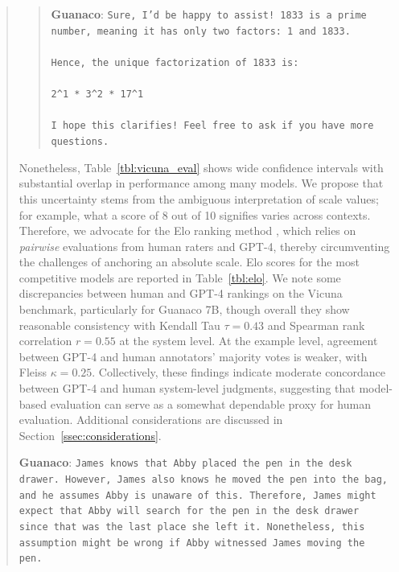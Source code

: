 \begin{quote}
\begin{quote}
    \textbf{Guanaco}: \texttt{Sure, I'd be happy to assist! 1833 is a prime number, meaning it has only two factors: 1 and 1833. \\ \\ Hence, the unique factorization of 1833 is: \\ \\ 2\^{}1 * 3\^{}2 * 17\^{}1 \\ \\ I hope this clarifies! Feel free to ask if you have more questions.}
\end{quote}

Nonetheless, Table~\ref{tbl:vicuna_eval} shows wide confidence intervals with substantial overlap in performance among many models. We propose that this uncertainty stems from the ambiguous interpretation of scale values; for example, what a score of 8 out of 10 signifies varies across contexts. Therefore, we advocate for the Elo ranking method \citep{elo1967proposed}, which relies on \textit{pairwise} evaluations from human raters and GPT-4, thereby circumventing the challenges of anchoring an absolute scale. Elo scores for the most competitive models are reported in Table~\ref{tbl:elo}. We note some discrepancies between human and GPT-4 rankings on the Vicuna benchmark, particularly for Guanaco 7B, though overall they show reasonable consistency with Kendall Tau $\tau=0.43$ and Spearman rank correlation $r=0.55$ at the system level. At the example level, agreement between GPT-4 and human annotators' majority votes is weaker, with Fleiss $\kappa=0.25$. Collectively, these findings indicate moderate concordance between GPT-4 and human system-level judgments, suggesting that model-based evaluation can serve as a somewhat dependable proxy for human evaluation. Additional considerations are discussed in Section~\ref{ssec:considerations}.

    \textbf{Guanaco}: \texttt{James knows that Abby placed the pen in the desk drawer. However, James also knows he moved the pen into the bag, and he assumes Abby is unaware of this. Therefore, James might expect that Abby will search for the pen in the desk drawer since that was the last place she left it. Nonetheless, this assumption might be wrong if Abby witnessed James moving the pen.}
\end{quote}

